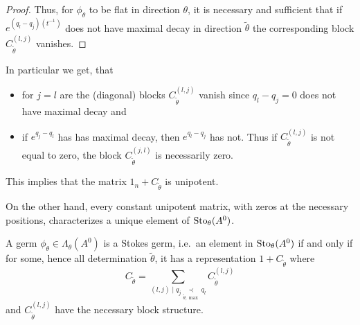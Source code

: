 \begin{proof}
\begin{comment}
    \begin{align*}
      \phi_\theta(t)
      &=t^Le^{Q(t^{-1})}\left(
        1_n+C_{\tilde\theta}
      \right)e^{-Q(t^{-1})}t^{-L}
    \\&=t^Le^{Q(t^{-1})}\left(
        1_n+\sum_{(l,j)}C_{\tilde\theta}^{(l,j)}
      \right)e^{-Q(t^{-1})}t^{-L}
    \\&=t^L\left(
        1_n+\sum_{(l,j)}e^{Q(t^{-1})}C_{\tilde\theta}^{(l,j)}e^{-Q(t^{-1})}
      \right)t^{-L}
    \\&=t^L\left(
          1_n+\sum_{(l,j)}C_{\tilde\theta}^{(l,j)}e^{(q_l-q_j)(t^{-1})}
        \right)t^{-L} \,.
    \end{align*}
  \end{comment}
  Thus, for $\phi_{\theta}$ to be flat in direction $\theta$, it is
  necessary and sufficient that if $e^{(q_l-q_j)(t^{-1})}$ does not have
  maximal decay in direction $\tilde\theta$ the corresponding
  block $C_{\tilde\theta}^{(l,j)}$ vanishes.

\end{proof}

In particular we get, that
\begin{itemize}
  \item for $j=l$ are the (diagonal) blocks $C_{\tilde\theta}^{(l,j)}$ vanish
    since $q_l-q_j=0$ does not have maximal decay and
  \item if $e^{q_j-q_l}$ has has maximal decay, then $e^{q_l-q_j}$ has not.
    Thus if $C_{\tilde\theta}^{(l,j)}$ is not equal to zero, the block
    $C_{\tilde\theta}^{(j,l)}$ is necessarily zero.
\end{itemize}
\begin{rem}
  This implies that the matrix $1_n+C_{\tilde\theta}$ is unipotent.
\end{rem}
On the other hand, every constant unipotent matrix, with zeros at the necessary
positions, characterizes a unique element of $\operatorname{Sto}_\theta(A^0)$.
\TODO[Isomorphic to $\C^{?}$?]

\begin{lem}
  A germ $\phi_\theta\in\Lambda_\theta(A^0)$ is a Stokes germ, i.e.\ an element
  in $\operatorname{Sto}_\theta(A^0)$ if and only if for some, hence all determination
  $\tilde\theta$, it has a representation $1+C_{\tilde\theta}$ where
  \[
    C_{\tilde\theta}=\sum_{(l,j)\mid q_j\underset{\tilde\theta,\max}{\prec}q_l}
    C_{\tilde\theta}^{(l,j)}
  \]
  and $C_{\tilde\theta}^{(l,j)}$ have the necessary block structure.
\end{lem}

